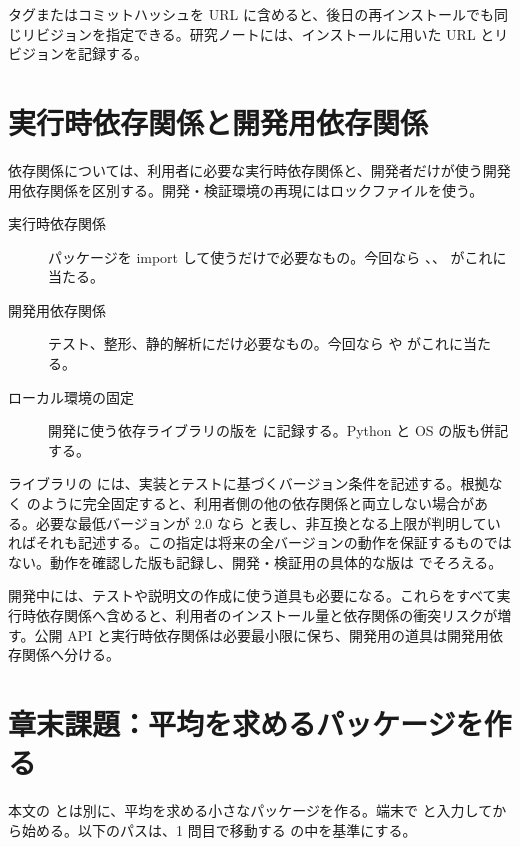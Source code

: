 タグまたはコミットハッシュを URL に含めると、後日の再インストールでも同じリビジョンを指定できる。研究ノートには、インストールに用いた URL とリビジョンを記録する。

\section{実行時依存関係と開発用依存関係}

依存関係については、利用者に必要な実行時依存関係と、開発者だけが使う開発用依存関係を区別する。開発・検証環境の再現にはロックファイルを使う。

\begin{description}
\item[実行時依存関係] パッケージを import して使うだけで必要なもの。今回なら 、、 がこれに当たる。
\item[開発用依存関係] テスト、整形、静的解析にだけ必要なもの。今回なら  や  がこれに当たる。
\item[ローカル環境の固定] 開発に使う依存ライブラリの版を  に記録する。Python と OS の版も併記する。
\end{description}

ライブラリの  には、実装とテストに基づくバージョン条件を記述する。根拠なく  のように完全固定すると、利用者側の他の依存関係と両立しない場合がある。必要な最低バージョンが 2.0 なら  と表し、非互換となる上限が判明していればそれも記述する。この指定は将来の全バージョンの動作を保証するものではない。動作を確認した版も記録し、開発・検証用の具体的な版は  でそろえる。

開発中には、テストや説明文の作成に使う道具も必要になる。これらをすべて実行時依存関係へ含めると、利用者のインストール量と依存関係の衝突リスクが増す。公開 API と実行時依存関係は必要最小限に保ち、開発用の道具は開発用依存関係へ分ける。

\section{章末課題：平均を求めるパッケージを作る}

本文の  とは別に、平均を求める小さなパッケージを作る。端末で  と入力してから始める。以下のパスは、1 問目で移動する  の中を基準にする。

